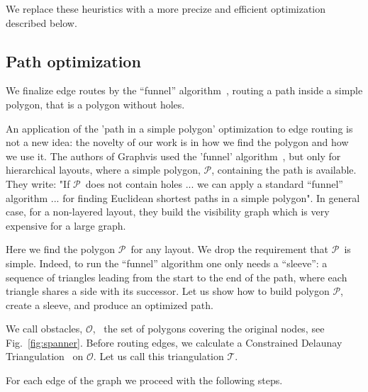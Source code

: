 \documentclass{gd-llncs}
\newcommand{\plg}{$\mathcal{P}$}
\begin{document}
We replace these heuristics with a more precize and efficient optimization described below.
\subsection*{Path optimization} { 
  We finalize edge routes by the “funnel” algorithm~\cite{chazelle1982theorem,hershberger1994computing}, routing a path inside a simple polygon, that is a polygon without holes.

An application of the 'path in a simple polygon' optimization to edge routing is not a new idea: the novelty of our work is in how we find the polygon and how we use it.
The authors of Graphvis used the 'funnel' algorithm~\cite{dobkin1997implementing}, but only for hierarchical layouts, where a simple polygon, \plg, containing the path is available. They write: "If \plg~does not contain holes ... we can apply a
standard “funnel” algorithm ... for finding Euclidean shortest paths in a simple polygon". In general case,
for a non-layered layout, they build the visibility graph which is very expensive for a large graph.

Here we find the polygon \plg~for any layout. We drop the requirement that \plg~is simple. Indeed, to run the “funnel” algorithm one only needs a “sleeve”: a sequence of triangles leading from the start to the end of the path, where each triangle shares a side with its successor. Let us show how to build polygon \plg, create a sleeve, and produce an optimized path.

We call obstacles, $\mathcal{O}$, ~the set of polygons covering the original nodes, see Fig.~\ref{fig:spanner}. Before routing edges, we calculate a Constrained Delaunay Triangulation~\cite{delaunay1934sphere} on $\mathcal{O}$. Let us call this triangulation $\mathcal{T}$. 

For each edge of the graph we proceed with the following steps.

}
\end{document}
